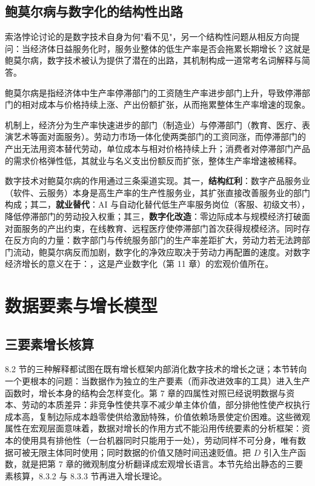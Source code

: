 \subsection{鲍莫尔病与数字化的结构性出路}

索洛悖论讨论的是数字技术自身为何"看不见"，另一个结构性问题从相反方向提问：当经济体日益服务化时，服务业整体的低生产率是否会拖累长期增长？这就是鲍莫尔病，数字技术被认为提供了潜在的出路，其机制构成一道常考名词解释与简答。

\begin{definition}
鲍莫尔病是指经济体中生产率停滞部门的工资随生产率进步部门上升，导致停滞部门的相对成本与价格持续上涨、产出份额扩张，从而拖累整体生产率增速的现象。
\end{definition}

机制上，经济分为生产率快速进步的部门（制造业）与停滞部门（教育、医疗、表演艺术等面对面服务）。劳动力市场一体化使两类部门的工资同涨，而停滞部门的产出无法用资本替代劳动，单位成本与相对价格持续上升；消费者对停滞部门产品的需求价格弹性低，其就业与名义支出份额反而扩张，整体生产率增速被稀释。

数字技术对鲍莫尔病的作用通过三条渠道实现。其一，\textbf{结构红利}：数字产品服务业（软件、云服务）本身是高生产率的生产性服务业，其扩张直接改善服务业的部门构成；其二，\textbf{就业替代}：AI 与自动化替代低生产率服务岗位（客服、初级文书），降低停滞部门的劳动投入权重；其三，\textbf{数字化改造}：零边际成本与规模经济打破面对面服务的产出约束，在线教育、远程医疗使停滞部门首次获得规模经济。同时存在反方向的力量：数字部门与传统服务部门的生产率差距扩大，劳动力若无法跨部门流动，鲍莫尔病反而加剧，数字化的净效应取决于劳动力再配置的速度。对数字经济增长的意义在于：，这是产业数字化（第 11 章）的宏观价值所在。

\section{数据要素与增长模型}

\subsection{三要素增长核算}

8.2 节的三种解释都试图在既有增长框架内部消化数字技术的增长之谜；本节转向一个更根本的问题：当数据作为独立的生产要素（而非改进效率的工具）进入生产函数时，增长本身的结构会怎样变化。第 7 章的四属性对照已经说明数据与资本、劳动的本质差异：非竞争性使共享不减少单主体价值，部分排他性使产权执行成本高，复制边际成本趋零使供给激励特殊，价值依赖场景使定价困难。这些微观属性在宏观层面意味着，数据对增长的作用方式不能沿用传统要素的分析框架：资本的使用具有排他性（一台机器同时只能用于一处），劳动同样不可分身，唯有数据可被无限主体同时使用；同时数据的价值又随时间迅速贬值。把 $D$ 引入生产函数，就是把第 7 章的微观制度分析翻译成宏观增长语言。本节先给出静态的三要素核算，8.3.2 与 8.3.3 节再进入增长理论。

